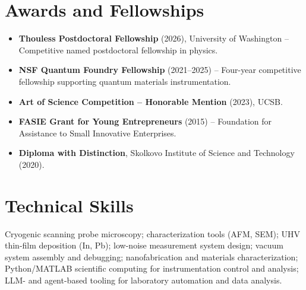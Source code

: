 \documentclass[11pt]{article}
\begin{document}
\section*{Awards and Fellowships}
\begin{itemize}[leftmargin=*]
    \item \textbf{Thouless Postdoctoral Fellowship} (2026), University of Washington -- Competitive named postdoctoral fellowship in physics.
    \item \textbf{NSF Quantum Foundry Fellowship} (2021--2025) -- Four-year competitive fellowship supporting quantum materials instrumentation.
    \item \textbf{Art of Science Competition -- Honorable Mention} (2023), UCSB.
    \item \textbf{FASIE Grant for Young Entrepreneurs} (2015) -- Foundation for Assistance to Small Innovative Enterprises.
    \item \textbf{Diploma with Distinction}, Skolkovo Institute of Science and Technology (2020).
\end{itemize}

\section*{Technical Skills}
Cryogenic scanning probe microscopy; characterization tools (AFM, SEM); UHV thin-film deposition (In, Pb); low-noise measurement system design; vacuum system assembly and debugging; nanofabrication and materials characterization; Python/MATLAB scientific computing for instrumentation control and analysis; LLM- and agent-based tooling for laboratory automation and data analysis.
\end{document}
